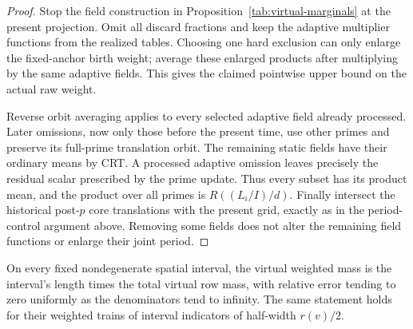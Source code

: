 \begin{proof}
Stop the field construction in
Proposition~\ref{tab:virtual-marginals} at the present projection.
Omit all discard fractions and keep the adaptive multiplier functions
from the realized tables. Choosing one hard exclusion can only enlarge
the fixed-anchor birth weight; average these enlarged products after
multiplying by the same adaptive fields. This gives the claimed
pointwise upper bound on the actual raw weight.

Reverse orbit averaging applies to every selected adaptive field
already processed. Later omissions, now only those before the present
time, use other primes and preserve its full-prime translation orbit.
The remaining static fields have their ordinary means by CRT. A
processed adaptive omission leaves precisely the residual scalar prescribed by
the prime update. Thus every subset has its product mean, and the
product over all primes is $R((L_i/I)/d)$. Finally intersect the
historical post-$p$ core translations with the present grid, exactly
as in the period-control argument above. Removing some fields does
not alter the remaining field functions or enlarge their joint period.
\end{proof}

\begin{lemma}
\label{tab:equidistribution}
On every fixed nondegenerate spatial interval, the virtual
weighted mass is the interval's length times the total virtual
row mass, with relative error tending to zero uniformly as the
denominators tend to infinity.  The same statement holds for
their weighted trains
of interval indicators of half-width $r(v)/2$.
\end{lemma}

